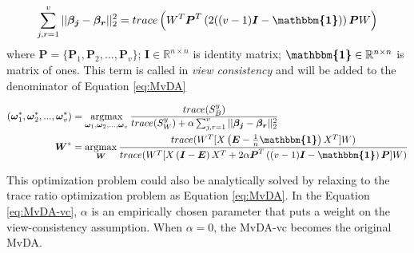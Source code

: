         \begin{equation}
            \sum_{j,r=1}^{v}||\boldsymbol{\beta_j} - \boldsymbol{\beta_r}||_2^2 = trace\left(W^{T}\boldsymbol{P}^{T}\left(2((v - 1)\boldsymbol{I} - \boldsymbol{\mathbbm{1}})\right)\boldsymbol{P}W\right)
        \end{equation}
        where $\boldsymbol{P} = \{\boldsymbol{P}_1,\boldsymbol{P}_2,...,\boldsymbol{P}_v\}$; $\boldsymbol{I} \in \mathbb{R}^{n\times n}$ is identity matrix; $\boldsymbol{\mathbbm{1}} \in \mathbb{R}^{n\times n}$ is matrix of ones.
        This term is called in \cite{kan2016multi} {\itshape view consistency} and will be added to the denominator of Equation \eqref{eq:MvDA}

        \begin{align}
            (\boldsymbol{\omega}_1^*,\boldsymbol{\omega}_2^*, ..., \boldsymbol{\omega}_v^*) &= \operatorname*{argmax}_{\boldsymbol{\omega}_1, \boldsymbol{\omega}_2,..., \boldsymbol{\omega}_v}\frac{trace({S}_B^y)}{trace({S}_W^y) + \alpha\sum_{j,r=1}^{v}||\boldsymbol{\beta_j} - \boldsymbol{\beta_r}||_2^2}\\
            \boldsymbol{W}^* &= \operatorname*{argmax}_{\boldsymbol{W}}\frac{trace(W^{T}[X\left(\boldsymbol{E} - \frac{1}{n}\boldsymbol{\mathbbm{1}}\right)X^{T}]W)}{trace(W^{T}[X\left(\boldsymbol{I} - \boldsymbol{E}\right)X^{T} + 2\alpha\boldsymbol{P}^T\left((v - 1)\boldsymbol{I} - \boldsymbol{\mathbbm{1}}\right)\boldsymbol{P}]W)}
            \label{eq:MvDA-vc}
        \end{align}

        This optimization problem could also be analytically solved by relaxing to the trace ratio optimization problem as Equation \eqref{eq:MvDA}.
        In the Equation \eqref{eq:MvDA-vc}, $\alpha$ is an empirically chosen parameter that puts a weight on the view-consistency assumption.
        When $\alpha = 0$, the MvDA-vc becomes the original MvDA. 
